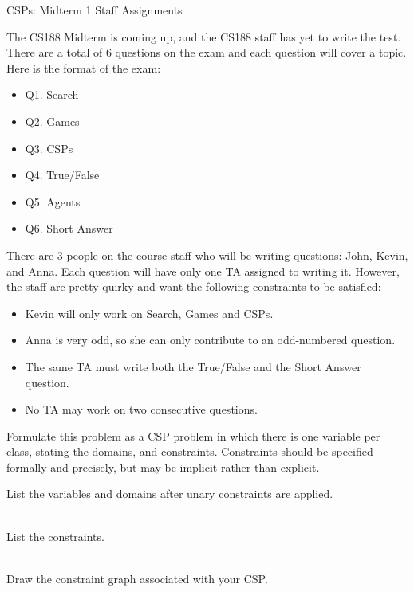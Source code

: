 \begin{problem}{CSPs: Midterm 1 Staff Assignments}

The CS188 Midterm is coming up, and the CS188 staff has yet to write the test. There are a total of 6 questions on the exam and each question will cover a topic. Here is the format of the exam:

\begin{itemize}
\item Q1. Search
\item Q2. Games
\item Q3. CSPs
\item Q4. True/False
\item Q5. Agents
\item Q6. Short Answer
\end{itemize}

There are 3 people on the course staff who will be writing questions: John, Kevin, and Anna. Each question will have only one TA assigned to writing it. However, the staff are pretty quirky and want the following constraints to be satisfied:
\begin{itemize}
\item Kevin will only work on Search, Games and CSPs.
\item Anna is very odd, so she can only contribute to an odd-numbered question.
\item The same TA must write both the True/False and the Short Answer question.
\item No TA may work on two consecutive questions.
\end{itemize}
\vspace{0.5cm}

\newpage

\begin{question}
Formulate this problem as a CSP problem in which there is one variable per class, stating the domains, and constraints. Constraints should be specified formally and precisely, but may be implicit rather than explicit.

\begin{subquestion}[7] List the variables and domains after unary constraints are applied.\\\\
\fbox{\begin{minipage}[t][6cm][t]{13cm}
\AnswerOneAi 
\end{minipage}}
\end{subquestion}

\begin{subquestion}[8] List the constraints.\\\\
\fbox{\begin{minipage}[t][6cm][t]{13cm}
\AnswerOneAii
\end{minipage}}
\end{subquestion}
\end{question}

\begin{question}[10] Draw the constraint graph associated with your CSP.\\\\
\fbox{\begin{minipage}[t][7cm][t]{13cm}
\AnswerOneB
\end{minipage}}
\end{question}

\end{problem}